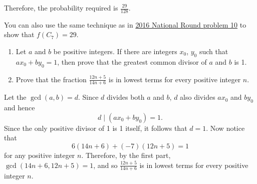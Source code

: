 \begin{solution}
    Therefore, the probability required is $\frac{29}{128}$.
\end{solution}
\begin{remark}
    You can also use the same technique as in \hyperref[sol: 2016 National
    Round P10]{2016 National Round problem 10} to show that $f(C_7) = 29$.
\end{remark}
\begin{question}
    \begin{enumerate}
        \item Let $a$ and $b$ be positive integers. If there are integers
            $x_{0}$, $y_{0}$ such that $ax_{0} + by_{0} = 1$, then prove that
            the greatest common divisor of $a$ and $b$ is 1. 
        
        \item Prove that the fraction $\frac{12n + 5}{14n + 6}$ is in lowest
            terms for every positive integer $n$.
    \end{enumerate}
\end{question}
\begin{solution}
    Let the $\gcd(a, b) = d$. Since $d$ divides both $a$ and $b$, $d$ also
    divides $ax_0$ and $by_0$ and hence
    \[ d \mid (ax_0 + by_0) = 1. \]
    Since the only positive divisor of 1 is 1 itself, it follows that $d = 1$.
    Now notice that
    \[ 6(14n + 6) + (-7)(12n + 5) = 1 \]
    for any positive integer $n$. Therefore, by the first part, $\gcd(14n + 6, 12n + 5) = 1$, and
    so $\frac{12n + 5}{14n + 6}$ is in lowest terms for every positive integer
    $n$.
\end{solution}

